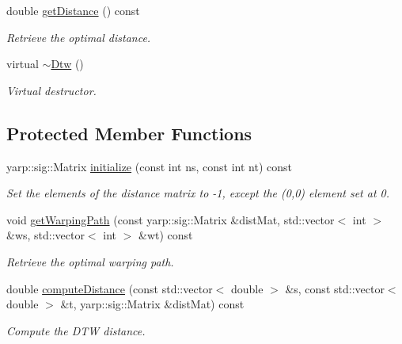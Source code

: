 \begin{DoxyCompactItemize}
double \mbox{\hyperlink{classassistive__rehab_1_1Dtw_ab530a2ea914ddab06899dfc511a13eed}{get\+Distance}} () const
\begin{DoxyCompactList}\small\item\em Retrieve the optimal distance. \end{DoxyCompactList}\item 
\mbox{\label{classassistive__rehab_1_1Dtw_a8d81b36760d197ede52df4c47bedb3ab}} 
virtual \mbox{\hyperlink{classassistive__rehab_1_1Dtw_a8d81b36760d197ede52df4c47bedb3ab}{$\sim$\+Dtw}} ()
\begin{DoxyCompactList}\small\item\em Virtual destructor. \end{DoxyCompactList}\end{DoxyCompactItemize}
\subsection*{Protected Member Functions}
\begin{DoxyCompactItemize}
\item 
yarp\+::sig\+::\+Matrix \mbox{\hyperlink{classassistive__rehab_1_1Dtw_a9b3ce7097b8646230f2f9a918126bbef}{initialize}} (const int ns, const int nt) const
\begin{DoxyCompactList}\small\item\em Set the elements of the distance matrix to -\/1, except the (0,0) element set at 0. \end{DoxyCompactList}\item 
void \mbox{\hyperlink{classassistive__rehab_1_1Dtw_ab5e7ac2f9658d042c39c0801def854e7}{get\+Warping\+Path}} (const yarp\+::sig\+::\+Matrix \&dist\+Mat, std\+::vector$<$ int $>$ \&ws, std\+::vector$<$ int $>$ \&wt) const
\begin{DoxyCompactList}\small\item\em Retrieve the optimal warping path. \end{DoxyCompactList}\item 
double \mbox{\hyperlink{classassistive__rehab_1_1Dtw_a05a9a7736a0c162303d15ff4f7936b50}{compute\+Distance}} (const std\+::vector$<$ double $>$ \&s, const std\+::vector$<$ double $>$ \&t, yarp\+::sig\+::\+Matrix \&dist\+Mat) const
\begin{DoxyCompactList}\small\item\em Compute the D\+TW distance. \end{DoxyCompactList}\end{DoxyCompactItemize}
